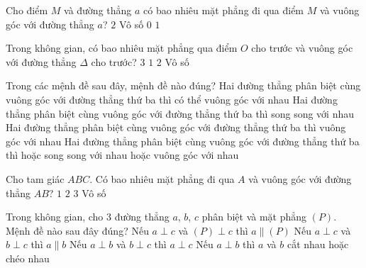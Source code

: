 \begin{ex}%
	Cho điểm $M$ và đường thẳng $a$ có bao nhiêu mặt  phẳng đi qua điểm $M$ và vuông góc với đường thẳng $a$?
	\choice 
		{$2$} 
		{Vô số} 
		 {$0$}
		{\True $1$} 
\end{ex}

\begin{ex}%
	Trong không gian, có bao nhiêu mặt phẳng qua điểm $O$ cho trước và vuông góc với đường thẳng $\Delta$ cho  trước?
	\choice 
		 {$3$}
		{\True  $1$}
		 {$2$}
		{Vô  số}
\end{ex}

\begin{ex}%
	Trong các mệnh đề sau đây,  mệnh đề nào đúng?
	\choice 
		{\True  Hai đường thẳng phân biệt cùng vuông góc với đường thẳng thứ ba thì có thể vuông góc với nhau}
		{Hai đường thẳng phân biệt cùng vuông góc với đường thẳng thứ ba  thì song song với nhau}
		{Hai đường thẳng phân  biệt cùng vuông góc với đường thẳng thứ ba thì vuông góc với nhau}
		{Hai đường thẳng phân biệt cùng vuông góc với đường thẳng thứ  ba thì hoặc song song với nhau hoặc vuông góc với nhau}
\end{ex}

\begin{ex}%
	Cho tam giác $ABC$. Có bao nhiêu  mặt phẳng đi qua $A$ và vuông góc với đường thẳng $AB$?
	 \choice
		 {\True $1$}
		 {$2$}
		 {$3$}
		{Vô  số}
\end{ex}

\begin{ex}%
	Trong không gian, cho $3$ đường thẳng $a$, $b$, $c$ phân biệt và mặt phẳng $(P)$.  Mệnh đề nào sau đây đúng?
	 \choice
		{Nếu $a  \perp c$ và $(P) \perp c$ thì $a \parallel (P)$}
		{Nếu $a \perp c$ và $b  \perp c$ thì $a \parallel b$}
		 {Nếu $a \perp b$ và $b \perp c$ thì $a \perp c$}
		{\True Nếu $a \perp b$ thì $a$  và $b$ cắt nhau hoặc chéo nhau}
\end{ex}

